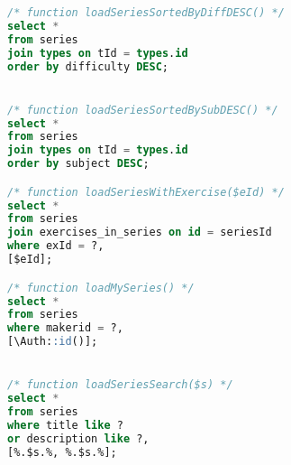 \begin{lstlisting}[language=sql]
/* function loadSeriesSortedByDiffDESC() */
select *
from series
join types on tId = types.id
order by difficulty DESC;


/* function loadSeriesSortedBySubDESC() */
select *
from series
join types on tId = types.id
order by subject DESC;

/* function loadSeriesWithExercise($eId) */
select *
from series
join exercises_in_series on id = seriesId
where exId = ?,
[$eId];

/* function loadMySeries() */
select *
from series
where makerid = ?,
[\Auth::id()];


/* function loadSeriesSearch($s) */
select *
from series
where title like ?
or description like ?,
[%.$s.%, %.$s.%];

\end{lstlisting}

